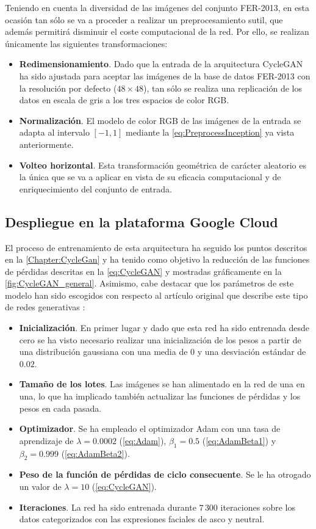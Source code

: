 Teniendo en cuenta la diversidad de las imágenes del conjunto FER-2013, en esta ocasión tan sólo se va a proceder a realizar un preprocesamiento sutil, que además permitirá disminuir el coste computacional de la red. Por ello, se realizan únicamente las siguientes transformaciones:
\begin{itemize}
    \item \textbf{Redimensionamiento}. Dado que la entrada de la arquitectura CycleGAN ha sido ajustada para aceptar las imágenes de la base de datos FER-2013 con la resolución por defecto ($48 \times 48$), tan sólo se realiza una replicación de los datos en escala de gris a los tres espacios de color RGB.
    \item \textbf{Normalización}. El modelo de color RGB de las imágenes de la entrada se adapta al intervalo $[-1, 1]$ mediante la \autoref{eq:PreprocessInception} ya vista anteriormente.
    \item \textbf{Volteo horizontal}. Esta transformación geométrica de carácter aleatorio es la única que se va a aplicar en vista de su eficacia computacional y de enriquecimiento del conjunto de entrada.
\end{itemize}

\subsection{Despliegue en la plataforma Google Cloud}

El proceso de entrenamiento de esta arquitectura ha seguido los puntos descritos en la \autoref{Chapter:CycleGan} y ha tenido como objetivo la reducción de las funciones de pérdidas descritas en la \autoref{eq:CycleGAN} y mostradas gráficamente en la \autoref{fig:CycleGAN_general}. Asimismo, cabe destacar que los parámetros de este modelo han sido escogidos con respecto al artículo original que describe este tipo de redes generativas \cite{cycleGAN}:
\begin{itemize}
    \item \textbf{Inicialización}. En primer lugar y dado que esta red ha sido entrenada desde cero se ha visto necesario realizar una inicialización de los pesos a partir de una distribución gaussiana con una media de $0$ y una desviación estándar de $0.02$. 
    \item \textbf{Tamaño de los lotes}. Las imágenes se han alimentado en la red de una en una, lo que ha implicado también actualizar las funciones de pérdidas y los pesos en cada pasada.
    \item \textbf{Optimizador}. Se ha empleado el optimizador Adam con una tasa de aprendizaje de $ \lambda = 0.0002$ (\autoref{eq:Adam}), $\beta_1 = 0.5$ (\autoref{eq:AdamBeta1}) y $\beta_2 = 0.999$ (\autoref{eq:AdamBeta2}).
    \item \textbf{Peso de la función de pérdidas de ciclo consecuente}. Se le ha otrogado un valor de $\lambda = 10$ (\autoref{eq:CycleGAN}).
    \item \textbf{Iteraciones}. La red ha sido entrenada durante $7\,300$ iteraciones sobre los datos categorizados con las expresiones faciales de asco y neutral.
\end{itemize}

